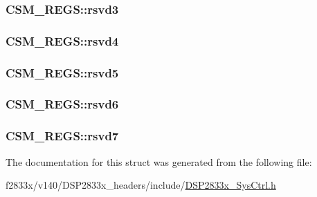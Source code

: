 \subsubsection[{rsvd3}]{ C\+S\+M\+\_\+\+R\+E\+G\+S\+::rsvd3}\label{struct_c_s_m___r_e_g_s_a99e02d181935057376511671542dd61c}
\hypertarget{struct_c_s_m___r_e_g_s_aae4e714538d044e01433943510615c54}{}
\subsubsection[{rsvd4}]{ C\+S\+M\+\_\+\+R\+E\+G\+S\+::rsvd4}\label{struct_c_s_m___r_e_g_s_aae4e714538d044e01433943510615c54}
\hypertarget{struct_c_s_m___r_e_g_s_adb1133c4a93f1b9e2dceda2b3dcf83a5}{}
\subsubsection[{rsvd5}]{ C\+S\+M\+\_\+\+R\+E\+G\+S\+::rsvd5}\label{struct_c_s_m___r_e_g_s_adb1133c4a93f1b9e2dceda2b3dcf83a5}
\hypertarget{struct_c_s_m___r_e_g_s_ae58303f1818d0833e2050b37be5f84f8}{}
\subsubsection[{rsvd6}]{ C\+S\+M\+\_\+\+R\+E\+G\+S\+::rsvd6}\label{struct_c_s_m___r_e_g_s_ae58303f1818d0833e2050b37be5f84f8}
\hypertarget{struct_c_s_m___r_e_g_s_a2aa082d9f598ea9e0a93de9af6498c06}{}
\subsubsection[{rsvd7}]{ C\+S\+M\+\_\+\+R\+E\+G\+S\+::rsvd7}\label{struct_c_s_m___r_e_g_s_a2aa082d9f598ea9e0a93de9af6498c06}


The documentation for this struct was generated from the following file\+:\begin{DoxyCompactItemize}
\item 
f2833x/v140/\+D\+S\+P2833x\+\_\+headers/include/\hyperlink{_d_s_p2833x___sys_ctrl_8h}{D\+S\+P2833x\+\_\+\+Sys\+Ctrl.\+h}\end{DoxyCompactItemize}
